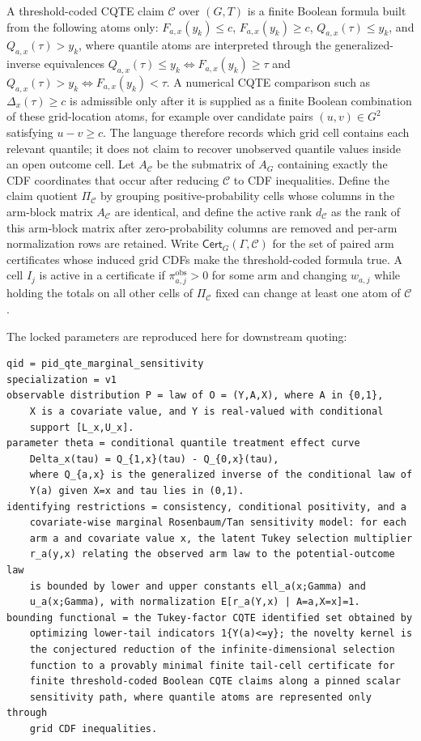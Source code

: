 \documentclass[11pt]{article}
\theoremstyle{definition}
\theoremstyle{plain}
\theoremstyle{remark}
\begin{document}
A threshold-coded CQTE claim \(\mathcal{C}\) over \((G,T)\) is a finite Boolean formula built from the following atoms only: \(F_{a,x}(y_k)\le c\), \(F_{a,x}(y_k)\ge c\), \(Q_{a,x}(\tau)\le y_k\), and \(Q_{a,x}(\tau)>y_k\), where quantile atoms are interpreted through the generalized-inverse equivalences \(Q_{a,x}(\tau)\le y_k\iff F_{a,x}(y_k)\ge\tau\) and \(Q_{a,x}(\tau)>y_k\iff F_{a,x}(y_k)<\tau\).  A numerical CQTE comparison such as \(\Delta_x(\tau)\ge c\) is admissible only after it is supplied as a finite Boolean combination of these grid-location atoms, for example over candidate pairs \((u,v)\in G^2\) satisfying \(u-v\ge c\).  The language therefore records which grid cell contains each relevant quantile; it does not claim to recover unobserved quantile values inside an open outcome cell.  Let \(A_{\mathcal{C}}\) be the submatrix of \(A_G\) containing exactly the CDF coordinates that occur after reducing \(\mathcal{C}\) to CDF inequalities.  Define the claim quotient \(\Pi_{\mathcal{C}}\) by grouping positive-probability cells whose columns in the arm-block matrix \(A_{\mathcal{C}}\) are identical, and define the active rank \(d_{\mathcal{C}}\) as the rank of this arm-block matrix after zero-probability columns are removed and per-arm normalization rows are retained.  Write \(\mathsf{Cert}_G(\Gamma,\mathcal{C})\) for the set of paired arm certificates whose induced grid CDFs make the threshold-coded formula true.  A cell \(I_j\) is active in a certificate if \(\pi^{\mathrm{obs}}_{a,j}>0\) for some arm and changing \(w_{a,j}\) while holding the totals on all other cells of \(\Pi_{\mathcal{C}}\) fixed can change at least one atom of \(\mathcal{C}\).

The locked parameters are reproduced here for downstream quoting:
\begin{verbatim}
qid = pid_qte_marginal_sensitivity
specialization = v1
observable distribution P = law of O = (Y,A,X), where A in {0,1},
    X is a covariate value, and Y is real-valued with conditional
    support [L_x,U_x].
parameter theta = conditional quantile treatment effect curve
    Delta_x(tau) = Q_{1,x}(tau) - Q_{0,x}(tau),
    where Q_{a,x} is the generalized inverse of the conditional law of
    Y(a) given X=x and tau lies in (0,1).
identifying restrictions = consistency, conditional positivity, and a
    covariate-wise marginal Rosenbaum/Tan sensitivity model: for each
    arm a and covariate value x, the latent Tukey selection multiplier
    r_a(y,x) relating the observed arm law to the potential-outcome law
    is bounded by lower and upper constants ell_a(x;Gamma) and
    u_a(x;Gamma), with normalization E[r_a(Y,x) | A=a,X=x]=1.
bounding functional = the Tukey-factor CQTE identified set obtained by
    optimizing lower-tail indicators 1{Y(a)<=y}; the novelty kernel is
    the conjectured reduction of the infinite-dimensional selection
    function to a provably minimal finite tail-cell certificate for
    finite threshold-coded Boolean CQTE claims along a pinned scalar
    sensitivity path, where quantile atoms are represented only through
    grid CDF inequalities.
\end{verbatim}
\end{document}
